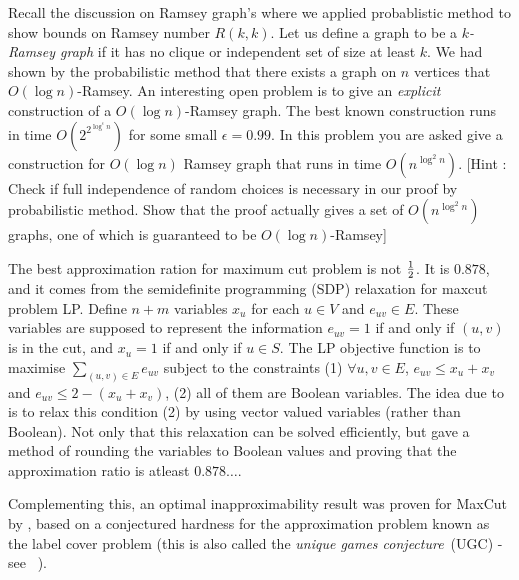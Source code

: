 \begin{exercise}
Recall the discussion on Ramsey graph's where we applied probablistic method to show bounds on Ramsey number $R(k,k)$. Let us define a graph to be a \textit{$k$-Ramsey graph} if it has no clique or independent set of size at least $k$. We had shown by the probabilistic method that there exists a graph on $n$ vertices that $O(\log n)$-Ramsey. An interesting open problem is to give an \textit{explicit} construction of a $O(\log n)$-Ramsey graph. The best known construction runs in time $O(2^{2^{\log^\epsilon n}})$ for some small $\epsilon=0.99$. In this problem you are asked give a construction for $O(\log n)$ Ramsey graph that runs in time $O(n^{\log^2 n})$. [Hint : Check if full independence of random choices is necessary in our proof by probabilistic method. Show that the proof actually gives a set of $O(n^{\log^2 n})$ graphs, one of which is guaranteed to be $O(\log n)$-Ramsey]
\end{exercise}

\begin{curiousity}
The best approximation ration for maximum cut problem is not $\frac{1}{2}$. It is $0.878$, and it comes from the semidefinite programming (SDP) relaxation for maxcut problem LP. Define $n+m$ variables $x_u$ for each $u \in V$ and $e_{uv} \in E$. These variables are supposed to represent the information $e_{uv} = 1$ if and only if $(u,v)$ is in the cut, and $x_u = 1$ if and only if $u \in S$. The LP objective function is to maximise $\sum_{(u,v) \in E} e_{uv}$ subject to the constraints (1) $\forall u,v \in E$, $e_{uv} \le x_u+x_v$ and $e_{uv} \le 2-(x_u+x_v)$, (2) all of them are Boolean variables. The idea due to \cite{GW95} is to relax this condition (2) by using vector valued variables (rather than Boolean). Not only that this relaxation can be solved efficiently, but \cite{GW95} gave a method of rounding the variables to Boolean values and proving that the approximation ratio is atleast $0.878 \ldots$.

Complementing this, an optimal inapproximability result was proven for {\sc MaxCut} by \cite{Kho07}, based on a conjectured hardness for the approximation problem known as the label cover problem (this is also called the {\em unique games conjecture}~(UGC) - see ~\cite{Kho10}).
\end{curiousity}
